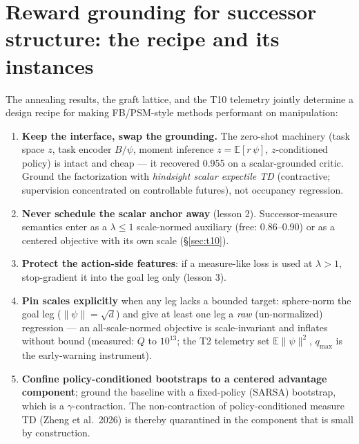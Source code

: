 \documentclass[11pt]{article}
\newcommand{\E}{\mathbb{E}}
\begin{document}
\section{Reward grounding for successor structure: the recipe and its instances}
\label{sec:grounding}

The annealing results, the graft lattice, and the T10 telemetry jointly determine a design
recipe for making FB/PSM-style methods performant on manipulation:

\begin{enumerate}[leftmargin=1.6em,itemsep=2pt]
\item \textbf{Keep the interface, swap the grounding.} The zero-shot machinery (task space
$z$, task encoder $B/\psi$, moment inference $z=\E[r\,\psi]$, $z$-conditioned policy) is
intact and cheap --- it recovered 0.955 on a scalar-grounded critic. Ground the factorization
with \emph{hindsight scalar expectile TD} (contractive; supervision concentrated on
controllable futures), not occupancy regression.
\item \textbf{Never schedule the scalar anchor away} (lesson 2). Successor-measure semantics
enter as a $\lambda\le1$ scale-normed auxiliary (free: 0.86--0.90) or as a centered objective
with its own scale (\S\ref{sec:t10}).
\item \textbf{Protect the action-side features}: if a measure-like loss is used at
$\lambda>1$, stop-gradient it into the goal leg only (lesson 3).
\item \textbf{Pin scales explicitly} when any leg lacks a bounded target: sphere-norm the
goal leg ($\|\psi\|=\sqrt d$) and give at least one leg a \emph{raw} (un-normalized)
regression --- an all-scale-normed objective is scale-invariant and inflates without bound
(measured: $Q$ to $10^{13}$; the T2 telemetry set $\E\|\psi\|^2$, $q_{\max}$ is the
early-warning instrument).
\item \textbf{Confine policy-conditioned bootstraps to a centered advantage component};
ground the baseline with a fixed-policy (SARSA) bootstrap, which is a $\gamma$-contraction.
The non-contraction of policy-conditioned measure TD (Zheng et al.\ 2026) is thereby
quarantined in the component that is small by construction.
\end{enumerate}
\end{document}
